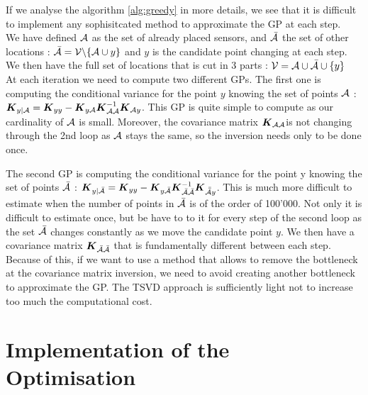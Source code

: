 If we analyse the algorithm \ref{alg:greedy} in more details, we see that it is difficult to implement any sophisitcated method to approximate the GP at each step. \\

We have defined $\mathcal{A}$ as the set of already placed sensors, and $\bar{\mathcal{A}}$ the set of other locations : $\bar{\mathcal{A}} = \mathcal{V} \backslash \{\mathcal{A} \cup y\} $ and $y$ is the candidate point changing at each step. We then have the full set of locations that is cut in 3 parts : $ \mathcal{V} = \mathcal{A} \cup \bar{\mathcal{A}} \cup \{y\} $ \\

At each iteration we need to compute two different GPs. The first one is computing the conditional variance for the point $y$ knowing the set of points $\mathcal{A}$ :   ${\boldsymbol{{K}}}_{y | \mathcal{A}} =  {\boldsymbol{{K}}}_{yy} - {\boldsymbol{{K}}}_{y\mathcal{A}} {\boldsymbol{{K}}}_{\mathcal{A}\mathcal{A}}^{-1} {\boldsymbol{{K}}}_{\mathcal{A} y} $. This GP is quite simple to compute as our cardinality of $\mathcal{A}$ is small. Moreover, the covariance matrix  ${\boldsymbol{{K}}}_{\mathcal{A}\mathcal{A}}$is not changing through the 2nd loop as $\mathcal{A}$ stays the same, so the inversion needs only to be done once. 

The second GP is computing the conditional variance for the point y knowing the set of points $\bar{\mathcal{A}}$ : ${\boldsymbol{{K}}}_{y | \bar{\mathcal{A}}} =  {\boldsymbol{{K}}}_{yy} - {\boldsymbol{{K}}}_{y\bar{\mathcal{A}}} {\boldsymbol{{K}}}_{\bar{\mathcal{A}}\bar{\mathcal{A}}}^{-1} {\boldsymbol{{K}}}_{\bar{\bar{\mathcal{A}}} y} $. This is much more difficult to estimate when the number of points in $\bar{\mathcal{A}}$ is of the order of 100’000. Not only it is difficult to estimate once, but be have to to it for every step of the second loop as the set $\bar{\mathcal{A}}$ changes constantly as we move the candidate point $y$. We then have a covariance matrix ${\boldsymbol{{K}}}_{\bar{\mathcal{A}}\bar{\mathcal{A}}}$ that is fundamentally different between each step. \\

Because of this, if we want to use a method that allows to remove the bottleneck at the covariance matrix inversion, we need to avoid creating another bottleneck to approximate the GP. The TSVD approach is sufficiently light not to increase too much the computational cost. 






\section{Implementation of the Optimisation}


